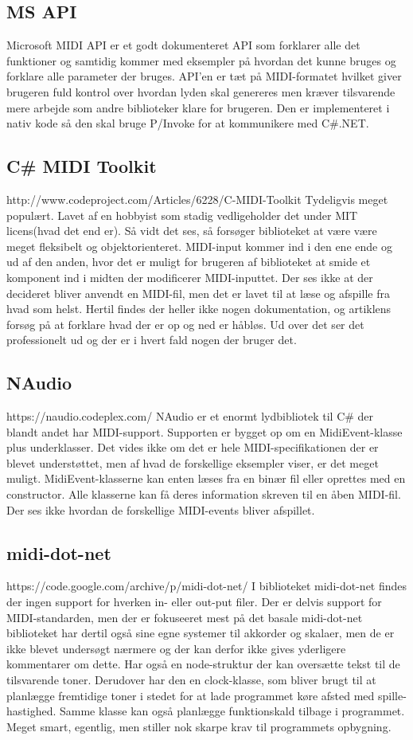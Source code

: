 \subsection{MS API}
Microsoft MIDI API er et godt dokumenteret API som forklarer alle det funktioner og samtidig kommer med eksempler på hvordan det kunne bruges og forklare alle parameter der bruges.
API’en er tæt på MIDI-formatet hvilket giver brugeren fuld kontrol over hvordan lyden skal genereres men kræver tilsvarende mere arbejde som andre biblioteker klare for brugeren. Den er implementeret i nativ kode så den skal bruge P/Invoke for at kommunikere med C#.NET.

\subsection{C# MIDI Toolkit}
http://www.codeproject.com/Articles/6228/C-MIDI-Toolkit
Tydeligvis meget populært. Lavet af en hobbyist som stadig vedligeholder det under MIT licens(hvad det end er).
Så vidt det ses, så forsøger biblioteket at være være meget fleksibelt og objektorienteret.  MIDI-input kommer ind i den ene ende og ud af den anden, hvor det er muligt for brugeren af biblioteket at smide et komponent ind i midten der modificerer MIDI-inputtet. Der ses ikke at der decideret bliver anvendt en MIDI-fil, men det er lavet til at læse og afspille fra hvad som helst.
Hertil findes der heller ikke nogen dokumentation, og artiklens forsøg på at forklare hvad der er op og ned er håbløs. Ud over det ser det professionelt ud og der er i hvert fald nogen der bruger det.
\subsection{NAudio}
https://naudio.codeplex.com/
NAudio er et enormt lydbibliotek til C# der blandt andet har MIDI-support. Supporten er bygget op om en MidiEvent-klasse plus underklasser. Det vides ikke om det er hele MIDI-specifikationen der er blevet understøttet, men af hvad de forskellige eksempler viser, er det meget muligt.
MidiEvent-klasserne kan enten læses fra en binær fil eller oprettes med en constructor. Alle klasserne kan få deres information skreven til en åben MIDI-fil.
Der ses ikke hvordan de forskellige MIDI-events bliver afspillet.
\subsection{midi-dot-net}
https://code.google.com/archive/p/midi-dot-net/
I biblioteket midi-dot-net findes der ingen support for hverken in- eller out-put filer. Der er delvis support for MIDI-standarden, men der er fokuseeret mest på det basale
midi-dot-net biblioteket har dertil også sine egne systemer til akkorder og skalaer, men de er ikke blevet undersøgt nærmere og der kan derfor ikke gives yderligere kommentarer om dette. Har også en node-struktur der kan oversætte tekst til de tilsvarende toner. 
Derudover har den en clock-klasse, som bliver brugt til at planlægge fremtidige toner i stedet for at lade programmet køre afsted med spille-hastighed. Samme klasse kan også planlægge funktionskald tilbage i programmet. Meget smart, egentlig, men stiller nok skarpe  krav til programmets opbygning.
